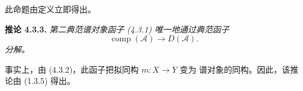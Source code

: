 \noindent 此命题由定义立即得出。

\medskip\noindent\textbf{推论 4.3.3.}\quad
\textit{第二典范谱对象函子 (4.3.1) 唯一地通过典范函子}
\[
\operatorname{comp}(\mathcal A)\longrightarrow D(\mathcal A).
\]
\noindent\textit{分解。}

事实上，由 (4.3.2)，此函子把拟同构 $m\colon X\longrightarrow Y$ 变为
谱对象的同构。因此，该推论由 (1.3.5) 得出。
\endgroup
